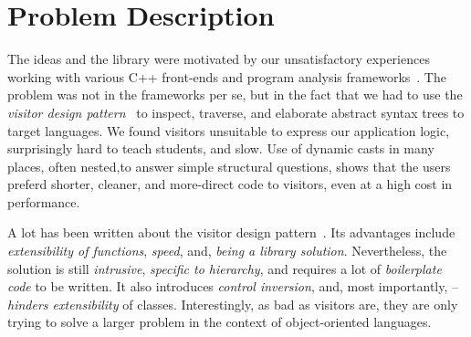\section{Problem Description} %
\label{sec:probl}

The ideas and the library were motivated by our unsatisfactory experiences 
working with various C++ front-ends and program analysis 
frameworks~\cite{Pivot09,Phoenix,Clang,Liz}.
The problem was not in the frameworks per se, but in the fact that we had to use
the \emph{visitor design pattern}~\cite{DesignPatterns1993} to inspect, traverse, and 
elaborate abstract syntax trees to target languages. We found visitors 
unsuitable to express our application logic, surprisingly hard to teach 
students, and slow. Use of dynamic casts in many places, often nested,to 
answer simple structural questions, shows that the users 
preferd shorter, cleaner, and more-direct code to visitors, even at a high 
cost in performance.

A lot has been written about the visitor design pattern~\cite{DesignPatterns1993,Zenger:2001,Oliveira08}. 
Its advantages include \emph{extensibility of functions}, \emph{speed}, and, \emph{being a library solution}. Nevertheless, the solution 
is still \emph{intrusive}, \emph{specific to hierarchy}, and requires a lot of 
\emph{boilerplate code} to be written. It also introduces \emph{control 
inversion}, and, most importantly, -- \emph{hinders extensibility} of classes.
Interestingly, as bad as visitors are, they are only trying to solve a larger 
problem in the context of object-oriented languages.



